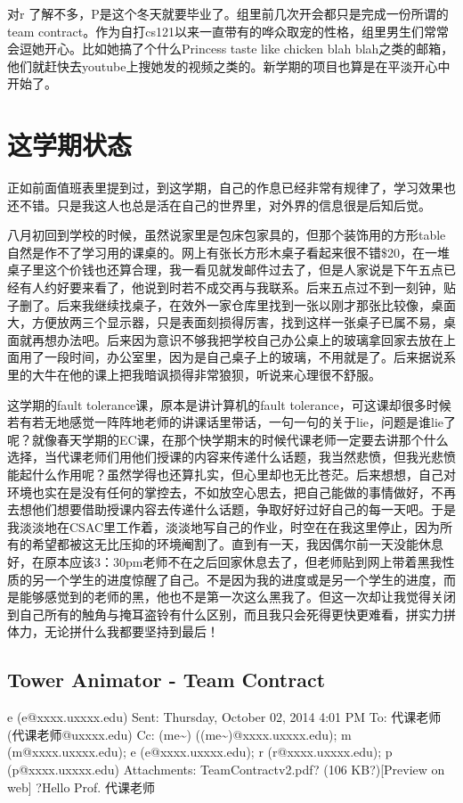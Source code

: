 \documentclass[12pt]{book}
\begin{document}
对r 了解不多，P是这个冬天就要毕业了。组里前几次开会都只是完成一份所谓的team contract。作为自打cs121以来一直带有的哗众取宠的性格，组里男生们常常会逗她开心。比如她搞了个什么Princess taste like chicken blah blah之类的邮箱，他们就赶快去youtube上搜她发的视频之类的。新学期的项目也算是在平淡开心中开始了。

\chapter{这学期状态}
\label{sec-14}

正如前面值班表里提到过，到这学期，自己的作息已经非常有规律了，学习效果也还不错。只是我这人也总是活在自己的世界里，对外界的信息很是后知后觉。　

八月初回到学校的时候，虽然说家里是包床包家具的，但那个装饰用的方形table自然是作不了学习用的课桌的。网上有张长方形木桌子看起来很不错\$20，在一堆桌子里这个价钱也还算合理，我一看见就发邮件过去了，但是人家说是下午五点已经有人约好要来看了，他说到时若不成交再与我联系。后来五点过不到一刻钟，贴子删了。后来我继续找桌子，在效外一家仓库里找到一张以刚才那张比较像，桌面大，方便放两三个显示器，只是表面刻损得厉害，找到这样一张桌子已属不易，桌面就再想办法吧。后来因为意识不够我把学校自己办公桌上的玻璃拿回家去放在上面用了一段时间，办公室里，因为是自己桌子上的玻璃，不用就是了。后来据说系里的大牛在他的课上把我暗讽损得非常狼狈，听说来心理很不舒服。

这学期的fault tolerance课，原本是讲计算机的fault tolerance，可这课却很多时候若有若无地感觉一阵阵地老师的讲课话里带话，一句一句的关于lie，问题是谁lie了呢？就像春天学期的EC课，在那个快学期末的时候代课老师一定要去讲那个什么选择，当代课老师们用他们授课的内容来传递什么话题，我当然悲愤，但我光悲愤能起什么作用呢？虽然学得也还算扎实，但心里却也无比苍茫。后来想想，自己对环境也实在是没有任何的掌控去，不如放空心思去，把自己能做的事情做好，不再去想他们想要借助授课内容去传递什么话题，争取好好过好自己的每一天吧。于是我淡淡地在CSAC里工作着，淡淡地写自己的作业，时空在在我这里停止，因为所有的希望都被这无比压抑的环境阉割了。直到有一天，我因偶尔前一天没能休息好，在原本应该3：30pm老师不在之后回家休息去了，但老师贴到网上带着黑我性质的另一个学生的进度惊醒了自己。不是因为我的进度或是另一个学生的进度，而是能够感觉到的老师的黑，他也不是第一次这么黑我了。但这一次却让我觉得关闭到自己所有的触角与掩耳盗铃有什么区别，而且我只会死得更快更难看，拼实力拼体力，无论拼什么我都要坚持到最后！

\section{Tower Animator - Team Contract}
\label{sec-14-1}
e (e@xxxx.uxxxx.edu)
Sent:        Thursday, October 02, 2014 4:01 PM
To:        
代课老师 (代课老师@uxxxx.edu)
Cc:        
(me\textasciitilde{}) ((me\textasciitilde{})@xxxx.uxxxx.edu); m (m@xxxx.uxxxx.edu); e (e@xxxx.uxxxx.edu); r (r@xxxx.uxxxx.edu); p (p@xxxx.uxxxx.edu)
Attachments:        
TeamContract\textunderscore v2.pdf? (106 KB?)[Preview on web]
?Hello Prof. 代课老师
\end{document}
